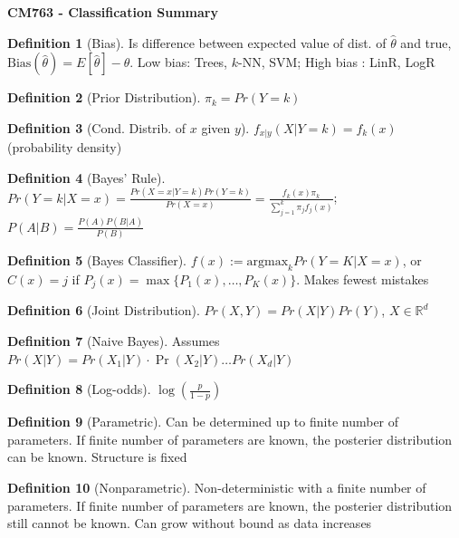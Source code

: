 \documentclass[9pt]{article}
\theoremstyle{definition}
\newtheorem{definition}{Definition}[section]
\begin{document}
\begin{multicols}{2}


\Large{\textbf{CM763 - Classification Summary}}\\
\normalsize
\begin{definition}[Bias]
Is difference between expected value of dist. of $\hat \theta$ and true, $\text{Bias}(\hat \theta) = E[\hat \theta] - \theta$. Low bias: Trees, $k$-NN, SVM; High bias : LinR, LogR
\end{definition}
\begin{definition}[Prior Distribution]
    $\pi_k = Pr(Y=k)$
\end{definition}
\begin{definition}[Cond. Distrib. of $x$ given $y$]
    $f_{x|y}(X\vert Y=k)= f_k(x)$ (probability density)
\end{definition}
\begin{definition}[Bayes' Rule] 
    $Pr(Y=k\vert X=x) = \frac{Pr(X=x\vert Y=k)Pr(Y=k)}{Pr(X=x)}= \frac{f_k(x)\pi_k}{\sum_{j=1}^k\pi_jf_j(x)}$; $P(A\vert B) = {\displaystyle \frac{P(A)P(B\vert A)}{P(B)}}$
\end{definition}
\begin{definition}[Bayes Classifier]
    $f(x):=\text{argmax}_k Pr(Y=K|X=x)$, or $C(x)=j$ if $P_j(x)=\max\{P_1(x),\dots,P_K(x)\}$. Makes fewest mistakes
\end{definition}
\begin{definition}[Joint Distribution]
    $Pr(X,Y)=Pr(X|Y)Pr(Y)$, $X\in\mathbb{R}^d$
\end{definition}
\begin{definition}[Naive Bayes]
    Assumes $Pr(X|Y) = Pr(X_1|Y)\cdot\Pr(X_2|Y)\dots Pr(X_d|Y)$
\end{definition}
\begin{definition}[Log-odds] 
    $\log\left(\frac{p}{1-p}\right)$
\end{definition}
\begin{definition}[Parametric]
    Can be determined up to finite number of parameters. If finite number of parameters are known, the posterier distribution can be known.  Structure is fixed
\end{definition}
\begin{definition}[Nonparametric]
    Non-deterministic with a finite number of parameters.  If finite number of parameters are known, the posterier distribution still cannot be known.  Can grow without bound as data increases

\end{definition}
\end{multicols}
\end{document}

